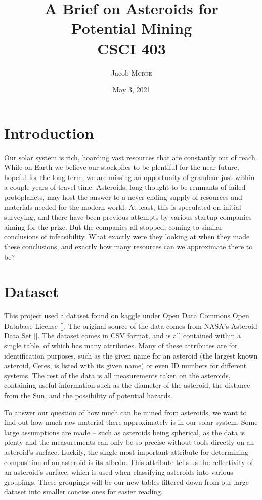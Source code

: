 \documentclass[12pt]{report}
\title{ A Brief on Asteroids for\\ Potential Mining\\ CSCI 403} %
\author{Jacob \textsc{Mcbee}} %
\date{May 3, 2021} %
\begin{document}
\maketitle %



\section*{Introduction}
\;\;\;\; Our solar system is rich, hoarding vast resources that are constantly out of reach. While on Earth we believe our stockpiles to be plentiful for the near future, hopeful for the long term, we are missing an opportunity of grandeur just within a couple years of travel time. Asteroids, long thought to be remnants of failed protoplanets, may host the answer to a never ending supply of resources and materials needed for the modern world. At least, this is speculated on initial surveying, and there have been previous attempts by various startup companies aiming for the prize. But the companies all stopped, coming to similar conclusions of infeasibility. What exactly were they looking at when they made these conclusions, and exactly how many resources can we approximate there to be? 


\section*{Dataset}
\;\;\;\; This project used a dataset found on \hyperlink{https://www.kaggle.com/sakhawat18/asteroid-dataset}{kaggle} under Open Data Commons Open Database License [\cite{Hossain}]. The original source of the data comes from NASA's Asteroid Data Set [\cite{JPL}]. The dataset comes in CSV format, and is all contained within a single table, of which has many attributes. Many of these attributes are for identification purposes, such as the given name for an asteroid (the largest known asteroid, Ceres, is listed with its given name) or even ID numbers for different systems. The rest of the data is all measurements taken on the asteroids, containing useful information such as the diameter of the asteroid, the distance from the Sun, and the possibility of potential hazards. 

\;\;\;\; To answer our question of how much can be mined from asteroids, we want to find out how much raw material there approximately is in our solar system. Some large assumptions are made -- such as asteroids being spherical, as the data is plenty and the measurements can only be so precise without tools directly on an asteroid's surface. Luckily, the single most important attribute for determining composition of an asteroid is its albedo. This attribute tells us the reflectivity of an asteroid's surface, which is used when classifying asteroids into various groupings. These groupings will be our new tables filtered down from our large dataset into smaller concise ones for easier reading. 
\end{document}
